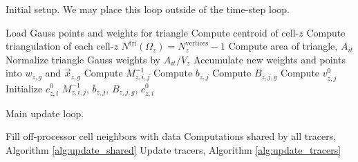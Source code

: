 \documentclass[11pt]{report}
\newcommand{\svec}[1]{{\Vec{#1}}}
\begin{document}
\begin{algorithm}[ht]
  \caption{Initial setup. We may place this loop outside of the time-step loop.}
  \label{alg:init_setup}
  \begin{algorithmic}[1]
    \State Load Gauss points and weights for triangle
     
      \State Compute centroid of cell-$z$
      \State Compute triangulation of each cell-$z$
      \State $N^\mathrm{tri}(\Omega_z) = N_z^\mathrm{vertices} - 1$
        
        \State Compute area of triangle, $A_{it}$
        \State Normalize triangle Gauss weights by $A_{it} / V_z$
        \State Accumulate new weights and points into $w_{z,g}$ and $\svec{x}_{z,g}$ 
      \EndFor
      \State Compute $M^{-1}_{z,i,j}$ 
      \State Compute $b_{z,j}$ 
      \State Compute $B_{z,j,g}$ 
      \State Compute $v^0_{z,j}$ 
      \State Initialize $c^0_{z,i}$ 
    \EndFor
    \State \Return $M^{-1}_{z,i,j}$, $b_{z,j}$, $B_{z,j,g}$, $c^0_{z,i}$
  \end{algorithmic}
\end{algorithm}

\begin{algorithm}[ht]
  \caption{Main update loop.}
  \label{alg:update}
  \begin{algorithmic}[1]
    \State Fill off-processor cell neighbors with data
     
      \State Computations shared by all tracers, Algorithm \ref{alg:update_shared}
      \State Update tracers, Algorithm \ref{alg:update_tracers}
    \EndFor {}
  \end{algorithmic}
\end{algorithm}
\end{document}
